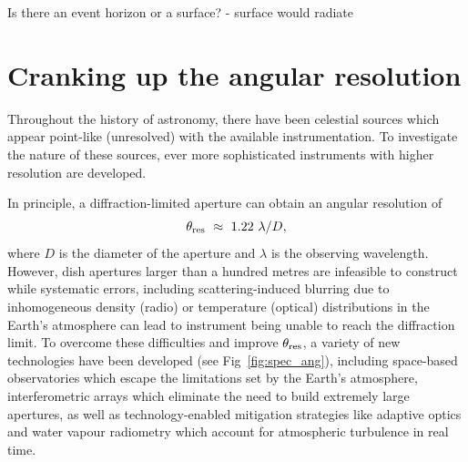 Is there an event horizon or a surface? - surface would radiate


\section{Cranking up the angular resolution}

Throughout the history of astronomy, there have been celestial sources which appear point-like (unresolved) with the available instrumentation. To investigate the nature of these sources, ever more sophisticated instruments with higher resolution are developed. 

In principle, a diffraction-limited aperture can obtain an angular resolution of
\begin{equation}\label{eq:ang_res}
 \theta_{\rm res}\ \approx \ 1.22\ \lambda / D,
\end{equation}
where $D$ is the diameter of the aperture and $\lambda$ is the observing wavelength. However, dish apertures larger than a hundred metres are infeasible to construct while systematic errors, including scattering-induced blurring due to inhomogeneous density (radio) or temperature (optical) distributions in the Earth's atmosphere can lead to instrument being unable to reach the diffraction limit. To overcome these difficulties and improve $\theta_{\rm res}$, a variety of new technologies have been developed (see Fig~\ref{fig:spec_ang}), including space-based observatories which escape the limitations set by the Earth's atmosphere, interferometric arrays which eliminate the need to build extremely large apertures, as well as technology-enabled mitigation strategies like adaptive optics and water vapour radiometry which account for atmospheric turbulence in real time. 


